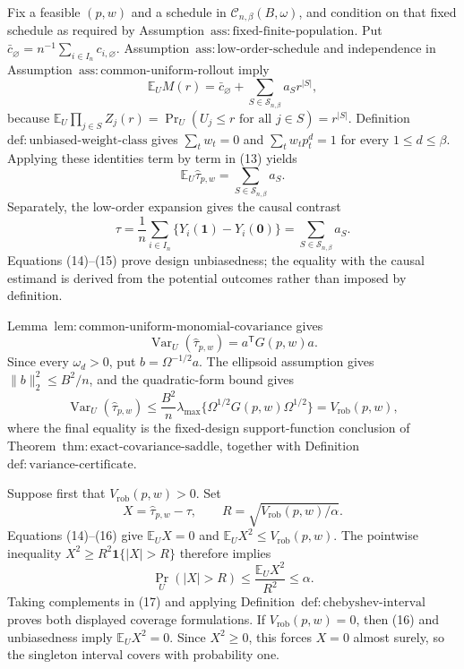 Fix a feasible \((p,w)\) and a schedule in \(\mathcal C_{n,\beta}(B,\omega)\), and condition on that fixed schedule as required by Assumption~\(\mathrm{ass{:}fixed\text{-}finite\text{-}population}\).  Put \(\bar c_{\varnothing}=n^{-1}\sum_{i\in I_n}c_{i,\varnothing}\).  Assumption~\(\mathrm{ass{:}low\text{-}order\text{-}schedule}\) and independence in Assumption~\(\mathrm{ass{:}common\text{-}uniform\text{-}rollout}\) imply
\[
\mathbb E_U M(r)
=\bar c_{\varnothing}
+\sum_{S\in\mathcal S_{n,\beta}}a_Sr^{|S|},
\tag{13}
\]
because \(\mathbb E_U\prod_{j\in S}Z_j(r)=\Pr_U(U_j\le r\text{ for all }j\in S)=r^{|S|}\).  Definition~\(\mathrm{def{:}unbiased\text{-}weight\text{-}class}\) gives \(\sum_tw_t=0\) and \(\sum_tw_tp_t^d=1\) for every \(1\le d\le\beta\).  Applying these identities term by term in (13) yields
\[
\mathbb E_U\widehat\tau_{p,w}
=\sum_{S\in\mathcal S_{n,\beta}}a_S.
\tag{14}
\]
Separately, the low-order expansion gives the causal contrast
\[
\tau
=\frac1n\sum_{i\in I_n}\{Y_i(\mathbf1)-Y_i(\mathbf0)\}
=\sum_{S\in\mathcal S_{n,\beta}}a_S.
\tag{15}
\]
Equations (14)--(15) prove design unbiasedness; the equality with the causal estimand is derived from the potential outcomes rather than imposed by definition.

Lemma~\(\mathrm{lem{:}common\text{-}uniform\text{-}monomial\text{-}covariance}\) gives
\[
\operatorname{Var}_U(\widehat\tau_{p,w})=a^{\mathsf T}G(p,w)a.
\]
Since every \(\omega_d>0\), put \(b=\Omega^{-1/2}a\).  The ellipsoid assumption gives \(\lVert b\rVert_2^2\le B^2/n\), and the quadratic-form bound gives
\[
\operatorname{Var}_U(\widehat\tau_{p,w})
\le \frac{B^2}{n}
\lambda_{\max}\{\Omega^{1/2}G(p,w)\Omega^{1/2}\}
=V_{\mathrm{rob}}(p,w),
\tag{16}
\]
where the final equality is the fixed-design support-function conclusion of Theorem~\(\mathrm{thm{:}exact\text{-}covariance\text{-}saddle}\), together with Definition~\(\mathrm{def{:}variance\text{-}certificate}\).

Suppose first that \(V_{\mathrm{rob}}(p,w)>0\).  Set
\[
X=\widehat\tau_{p,w}-\tau,
\qquad
R=\sqrt{V_{\mathrm{rob}}(p,w)/\alpha}.
\]
Equations (14)--(16) give \(\mathbb E_UX=0\) and \(\mathbb E_UX^2\le V_{\mathrm{rob}}(p,w)\).  The pointwise inequality \(X^2\ge R^2\mathbf1\{|X|>R\}\) therefore implies
\[
\Pr_U(|X|>R)
\le\frac{\mathbb E_UX^2}{R^2}
\le\alpha.
\tag{17}
\]
Taking complements in (17) and applying Definition~\(\mathrm{def{:}chebyshev\text{-}interval}\) proves both displayed coverage formulations.  If \(V_{\mathrm{rob}}(p,w)=0\), then (16) and unbiasedness imply \(\mathbb E_UX^2=0\).  Since \(X^2\ge0\), this forces \(X=0\) almost surely, so the singleton interval covers with probability one.